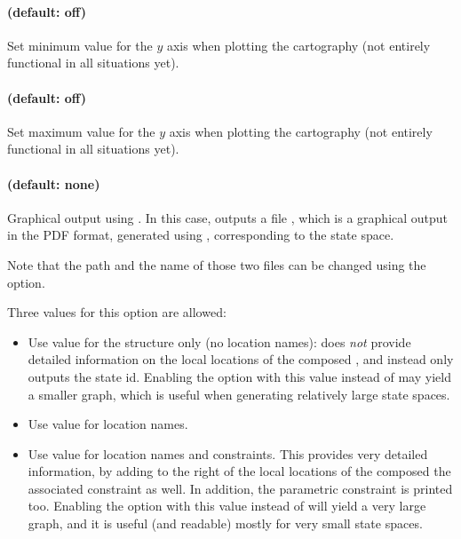 \paragraph{ (default: off)}
Set minimum value for the $y$ axis when plotting the cartography (not entirely functional in all situations yet).

\paragraph{ (default: off)}
Set maximum value for the $y$ axis when plotting the cartography (not entirely functional in all situations yet).



\paragraph{ (default: none)}
Graphical output using \gdot{}.
In this case, \imitator{} outputs a file , which is a graphical output in the PDF format, generated using \gdot{}, corresponding to the state space.

Note that the path and the name of those two files can be changed using the  option.

Three values for this option are allowed:
\begin{itemize}
	\item Use value  for the structure only (no location names): does \emph{not} provide detailed information on the local locations of the composed \IPTA{}, and instead only outputs the state id.
	      Enabling the option with this value instead of  may yield a smaller graph, which is useful when generating relatively large state spaces.

	\item Use value  for location names.

	\item Use value  for location names and constraints.
	      This provides very detailed information, by adding to the right of the local locations of the composed \IPTA{} the associated constraint as well.
	      In addition, the parametric constraint is printed too.
	      Enabling the option with this value instead of  will yield a very large graph, and it is useful (and readable) mostly for very small state spaces.

\end{itemize}





